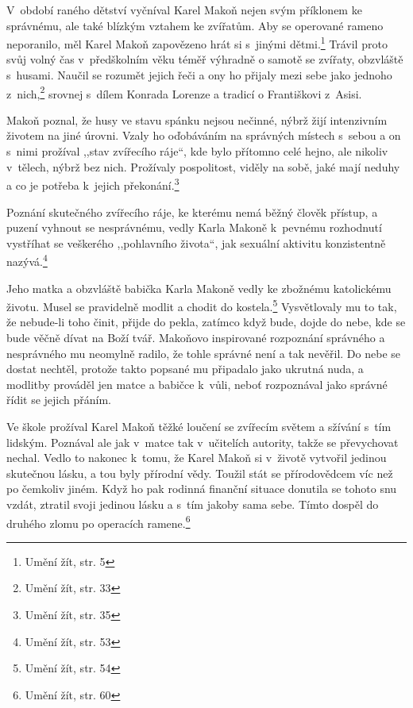 V~období raného dětství vyčníval Karel Makoň nejen svým příklonem ke správnému, ale
také blízkým vztahem ke zvířatům. Aby se operované rameno neporanilo, měl
Karel Makoň zapovězeno hrát si s~jinými dětmi.\footnote{Umění žít, str. 5} Trávil proto svůj volný čas
v~předškolním věku téměř výhradně o samotě se zvířaty, obzvláště s~husami.
Naučil se rozumět jejich řeči a ony ho přijaly mezi sebe jako jednoho
z~nich,\footnote{Umění žít, str. 33} srovnej s~dílem Konrada
Lorenze\cite{lorenz1949redete} a tradicí o Františkovi z~Asisi.\cite{thompson2012francis}

Makoň poznal, že husy ve stavu spánku nejsou nečinné, nýbrž žijí intenzivním
životem na jiné úrovni. Vzaly ho oďobáváním na správných místech s~sebou a on
s~nimi prožíval ,,stav zvířecího ráje``, kde bylo přítomno celé hejno, ale
nikoliv v~tělech, nýbrž bez nich. Prožívaly pospolitost, viděly na sobě, jaké
mají neduhy a co je potřeba k~jejich překonání.\footnote{Umění žít, str. 35}

Poznání skutečného zvířecího ráje, ke kterému nemá běžný člověk přístup, a
puzení vyhnout se nesprávnému, vedly Karla Makoně k~pevnému rozhodnutí vystříhat
se veškerého ,,pohlavního života``, jak sexuální aktivitu konzistentně
nazývá.\footnote{Umění žít, str. 53}

Jeho matka a obzvláště babička Karla Makoně vedly ke zbožnému katolickému
životu. Musel se pravidelně modlit a chodit do kostela.\footnote{Umění žít, str.
54} Vysvětlovaly mu to tak,
že nebude-li toho činit, přijde do pekla, zatímco když bude, dojde do nebe, kde
se bude věčně dívat na Boží tvář. Makoňovo inspirované rozpoznání správného a
nesprávného mu neomylně radilo, že tohle správné není a tak nevěřil. Do nebe se
dostat nechtěl, protože takto popsané mu připadalo jako ukrutná nuda, a modlitby
prováděl jen matce a babičce k~vůli, neboť rozpoznával jako správné řídit se
jejich přáním.

Ve škole prožíval Karel Makoň těžké loučení se zvířecím světem a sžívání s~tím
lidským. Poznával ale jak v~matce tak v~učitelích autority, takže se převychovat
nechal. Vedlo to nakonec k~tomu, že Karel Makoň si v~životě vytvořil jedinou
skutečnou lásku, a tou byly přírodní vědy. Toužil stát se přírodovědcem víc než
po čemkoliv jiném. Když ho pak rodinná finanční situace donutila se tohoto snu
vzdát, ztratil svoji jedinou lásku a s~tím jakoby sama sebe.
Tímto dospěl do druhého zlomu po operacích ramene.\footnote{Umění žít, str. 60}

